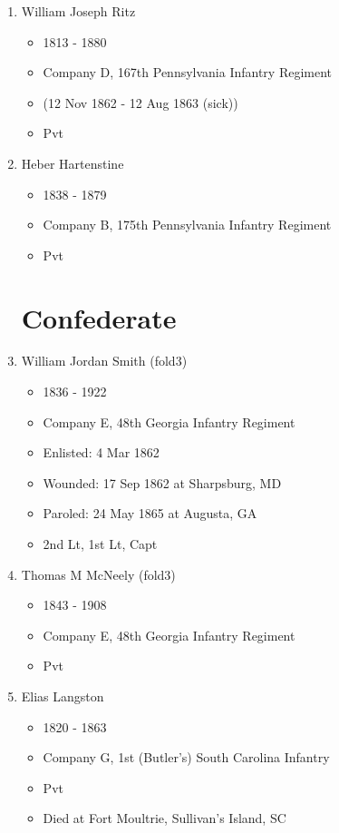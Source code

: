 \documentclass[11pt,letter]{book}
\begin{document}
\begin{enumerate}
\item William Joseph Ritz
\begin{itemize}
\item 1813 - 1880
\item Company D, 167th Pennsylvania Infantry Regiment
\item (12 Nov 1862 - 12 Aug 1863 (sick))
\item Pvt
\end{itemize}

\item Heber Hartenstine
\begin{itemize}
\item 1838 - 1879
\item Company B, 175th Pennsylvania Infantry Regiment
\item Pvt
\end{itemize}

\section{Confederate}

\item William Jordan Smith (fold3)
\begin{itemize}
\item 1836 - 1922
\item Company E, 48th Georgia Infantry Regiment
\item Enlisted:  4 Mar 1862
\item Wounded:  17 Sep 1862 at Sharpsburg, MD
\item Paroled:  24 May 1865 at Augusta, GA
\item 2nd Lt, 1st Lt, Capt
\end{itemize}

\item Thomas M McNeely (fold3)
\begin{itemize}
\item 1843 - 1908
\item Company E, 48th Georgia Infantry Regiment
\item Pvt
\end{itemize}

\item Elias Langston
\begin{itemize}
\item 1820 - 1863
\item Company G, 1st (Butler's) South Carolina Infantry
\item Pvt
\item Died at Fort Moultrie, Sullivan's Island, SC
\end{itemize}


\end{enumerate}
\end{document}
